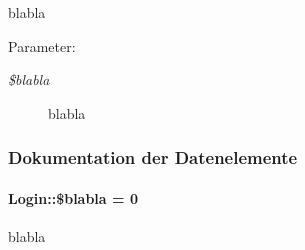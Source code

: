 blabla 

\begin{Desc}
\item[Parameter:]
\begin{description}
\item[{\em \$blabla}]blabla \end{description}
\end{Desc}


\subsubsection{Dokumentation der Datenelemente}
\hypertarget{classLogin_00bf0b2858a6ecc754cd00e7b21798e3}{
\paragraph[\$blabla]{\setlength{\rightskip}{0pt plus 5cm}Login::\$blabla = 0}\hfill}
\label{classLogin_00bf0b2858a6ecc754cd00e7b21798e3}


blabla 

